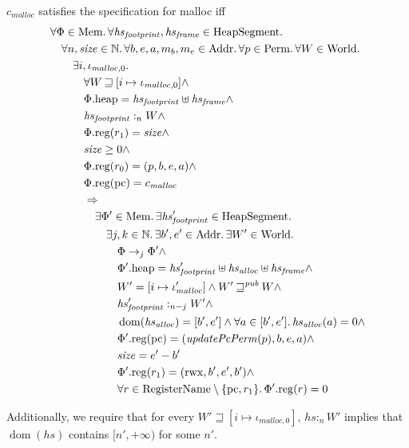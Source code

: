 \documentclass[a4paper]{article}
\DeclareMathOperator{\dom}{dom}
\newcommand{\var}[1]{\mathit{#1}}
\newcommand{\hs}{\var{hs}}
\newcommand{\pcreg}{\mathrm{pc}}
\newcommand{\heap}{\var{heap}}
\newcommand{\plainproj}[1]{\mathrm{#1}}
\newcommand{\memheap}[1][\Phi]{#1.\plainproj{heap}}
\newcommand{\memreg}[1][\Phi]{#1.\plainproj{reg}}
\newcommand{\plainfun}[2]{
  \ifthenelse{\equal{#2}{}}
             {\mathit{#1}}
             {\mathit{#1}(#2)}
}
\newcommand{\updatePcPerm}[1]{\plainfun{updatePcPerm}{#1}}
\newcommand{\future}{\mathbin{\sqsupseteq}}
\newcommand{\futurewk}{\mathbin{\sqsupseteq}^{\var{pub}}}
\newcommand{\heapSat}[3][\heap]{#1 :_{#2} #3}
\newcommand{\codelabel}[1]{\mathit{#1}}
\newcommand{\malloc}{\codelabel{malloc}}
\newcommand{\plaindom}[1]{\mathrm{#1}}
\newcommand{\Addrs}{\plaindom{Addr}}
\newcommand{\Mems}{\plaindom{Mem}}
\newcommand{\RegName}{\plaindom{RegisterName}}
\newcommand{\HeapSegments}{\plaindom{HeapSegment}}
\newcommand{\nats}{\mathbb{N}}
\newcommand{\Perms}{\plaindom{Perm}}
\newcommand{\Worlds}{\plaindom{World}}
\newcommand{\plainperm}[1]{\mathrm{#1}}
\newcommand{\rwx}{\plainperm{rwx}}
\newcommand{\step}[1][]{\rightarrow_{#1}}
\begin{document}
\begin{specification}[Malloc v.2]
  $c_\malloc$ satisfies the specification for malloc iff
  \begin{align*}
    &\forall \Phi \in \Mems \ldotp \forall \hsfoot, \hsframe \in \HeapSegments \ldotp \\
    &\quad \forall n, \size \in \nats \ldotp \forall b,e,a,m_b,m_e \in \Addrs\ldotp\forall p \in \Perms \ldotp \forall W \in \Worlds \ldotp\\
    &\qquad \exists i, \iota_{\malloc,0} \ldotp \\
    &\qquad \quad \forall W \future [i \mapsto \iota_{\malloc,0}] \land \\
    &\qquad \quad \memheap = \hsfoot \uplus \hsframe \land\\
    &\qquad \quad \heapSat[\hsfoot]{n}{W} \land \\
    &\qquad \quad \memreg(r_1) = \size \land \\
    &\qquad \quad \size \geq 0 \land \\
    &\qquad \quad \memreg(r_0) = (p,b,e,a) \land \\
    &\qquad \quad \memreg(\pcreg) = c_\malloc \\ %
    &\qquad \quad \Rightarrow \\
    &\qquad \qquad\exists \Phi' \in \Mems \ldotp \exists \hsfoot' \in \HeapSegments\ldotp\\
    &\qquad \qquad \quad \exists j,k \in \nats \ldotp \exists b',e'\in \Addrs \ldotp \exists W' \in \Worlds \ldotp \\
    &\qquad \qquad \qquad \Phi \step[j]\Phi' \land \\
    &\qquad \qquad \qquad \memheap[\Phi']=\hsfoot'\uplus \hs_{\var{alloc}} \uplus \hsframe \land\\
    &\qquad \qquad \qquad W' = [i \mapsto \iota_{\malloc}']\land W' \futurewk W \land \\
    &\qquad \qquad \qquad \heapSat[\hsfoot']{n-j}{W'} \land \\
    &\qquad \qquad \qquad \dom(\hs_{\var{alloc}}) = [b',e'] \land \forall a \in [b',e']\ldotp \hs_{\var{alloc}}(a) = 0  \land \\
    &\qquad \qquad \qquad \memreg[\Phi'](\pcreg) = (\updatePcPerm{p},b,e,a) \land \\
    &\qquad \qquad \qquad \size = e'-b' \\
    &\qquad \qquad \qquad \memreg[\Phi'](r_1) = (\rwx,b',e',b') \land \\
    &\qquad \qquad \qquad \forall r \in \RegName \setminus \{\pcreg,r_1\} \ldotp \memreg[\Phi'](r) = 0
  \end{align*}

  Additionally, we require that for every $W' \future [i\mapsto \iota_{\malloc,0}]$, $\heapSat[\hs]{n}{W'}$ implies that $\dom(\hs)$ contains $[n',+\infty)$ for some $n'$.
\end{specification}
\end{document}
